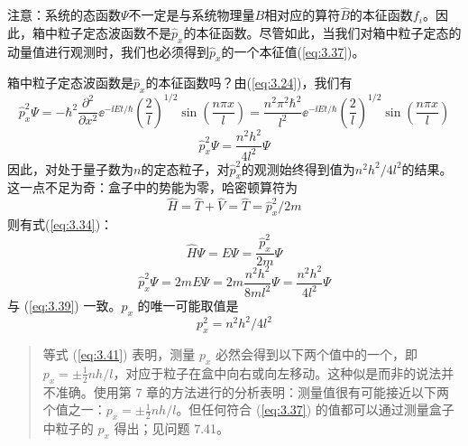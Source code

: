 	注意：系统的态函数$\Psi$不一定是与系统物理量$B$相对应的算符$\hat{B}$的本征函数$f_i$。因此，箱中粒子定态波函数不是$\hat{p}_x$的本征函数。尽管如此，当我们对箱中粒子定态的动量值进行观测时，我们也必须得到$\hat{p}_x$的一个本征值(\ref{eq:3.37})。

	箱中粒子定态波函数是$\hat{p}_x$的本征函数吗？由(\ref{eq:3.24})，我们有
	\begin{equation*}
		\hat{p}_x^2\Psi = -\hbar^2\frac{\partial^2}{\partial x^2}\ee ^{-\ii Et/\hbar}\left(\frac{2}{l}\right)^{1/2}\sin\left(\frac{n\pi x}{l}\right) = \frac{n^2\pi^2 \hbar^2}{l^2}\ee ^{-\ii Et/\hbar}\left(\frac{2}{l}\right)^{1/2}\sin\left(\frac{n\pi x}{l}\right)
	\end{equation*}
	\begin{equation}
		\hat{p}_x^2\Psi = \frac{n^2h^2}{4l^2}\Psi
		\label{eq:3.39}
	\end{equation}
	因此，对处于量子数为$n$的定态粒子，对$\hat{p}_x^2$的观测始终得到值为$n^2h^2/4l^2$的结果。这一点不足为奇：盒子中的势能为零，哈密顿算符为
	\begin{equation*}
		\hat{H} = \hat{T}+ \hat{V} = \hat{T} = \hat{p}_x^2/2m
	\end{equation*}
	则有式(\ref{eq:3.34})：
	\begin{equation*}
		\hat{H}\Psi = E\Psi = \frac{\hat{p}_x^2}{2m}\Psi
	\end{equation*}
	\begin{equation}
		\hat{p}_x^2\Psi = 2mE\Psi = 2m\frac{n^2h^2}{8ml^2}\Psi = \frac{n^2h^2}{4l^2}\Psi
		\label{eq:3.40}
	\end{equation}
	与 (\ref{eq:3.39}) 一致。$p_x$ 的唯一可能取值是
	\begin{equation}
		p_x^2 = n^2h^2 / 4l^2
		\label{eq:3.41}
	\end{equation}
	\begin{quote}
		\small %
		\noindent %
		等式 (\ref{eq:3.41}) 表明，测量 $p_x$ 必然会得到以下两个值中的一个，即$p_x = \pm \frac{1}{2}nh/l$，对应于粒子在盒中向右或向左移动。这种似是而非的说法并不准确。使用第 7 章的方法进行的分析表明：测量值很有可能接近以下两个值之一：$p_x = \pm \frac{1}{2}nh/l$。但任何符合 (\ref{eq:3.37}) 的值都可以通过测量盒子中粒子的 $p_x$ 得出；见问题 7.41。
	\end{quote}

